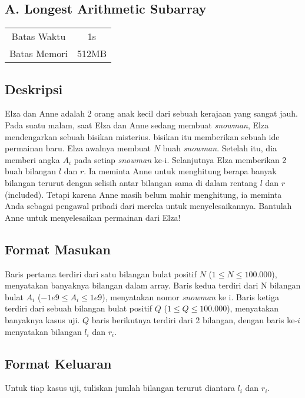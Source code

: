 \documentclass{article}
\begin{document}
\begin{center}
    \section*{A. Longest Arithmetic Subarray} %

    \begin{tabular}{ | c c | }
        \hline
        Batas Waktu  & 1s \\    %
        Batas Memori & 512MB \\  %
        \hline
    \end{tabular}
\end{center}

\subsection*{Deskripsi}

Elza dan Anne adalah 2 orang anak kecil dari sebuah kerajaan yang sangat jauh.
Pada suatu malam, saat Elza dan Anne sedang membuat \textit{snowman}, Elza mendengarkan sebuah bisikan misterius.
bisikan itu memberikan sebuah ide permainan baru. Elza awalnya membuat $N$ buah \textit{snowman}.
Setelah itu, dia memberi angka $A_i$ pada setiap \textit{snowman} ke-i.
Selanjutnya Elza memberikan 2 buah bilangan $l$ dan $r$. Ia meminta Anne untuk menghitung berapa banyak bilangan terurut 
dengan selisih antar bilangan sama di dalam rentang $l$ dan $r$ (included).
Tetapi karena Anne masih belum mahir menghitung, ia meminta Anda sebagai pengawal pribadi dari mereka untuk menyelesaikannya.
Bantulah Anne untuk menyelesaikan permainan dari Elza!

\subsection*{Format Masukan}

Baris pertama terdiri dari satu bilangan bulat positif $N$ ($1 \leq N \leq 100.000$), menyatakan banyaknya bilangan dalam array.
Baris kedua terdiri dari N bilangan bulat $A_i$ ($-1e9 \leq A_i \leq 1e9$), menyatakan nomor \textit{snowman} ke i.
Baris ketiga terdiri dari sebuah bilangan bulat positif $Q$ ($1 \leq Q \leq 100.000$), menyatakan banyaknya kasus uji.
$Q$ baris berikutnya terdiri dari 2 bilangan, dengan baris ke-$i$ menyatakan bilangan $l_i$ dan $r_i$.

\subsection*{Format Keluaran}
Untuk tiap kasus uji, tuliskan jumlah bilangan terurut diantara $l_i$ dan $r_i$.
\\
\end{document}
